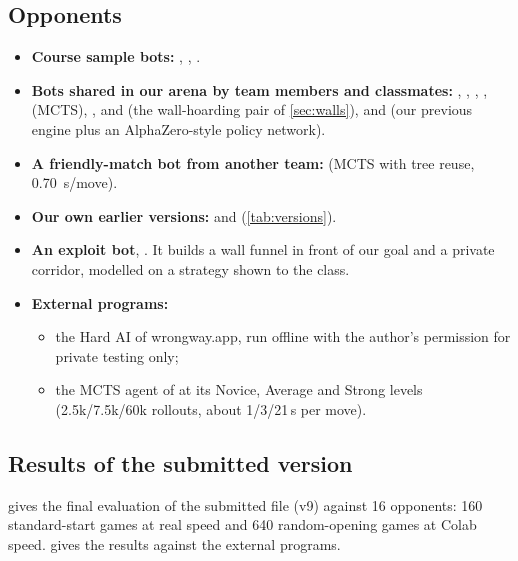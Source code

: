 \subsection{Opponents}
\label{sec:opponents}
\begin{itemize}
  \item \textbf{Course sample bots:} , , .
  \item \textbf{Bots shared in our arena by team members and classmates:}
        , , , ,
         (MCTS), ,  and 
        (the wall-hoarding pair of \cref{sec:walls}), and  (our previous
        engine plus an AlphaZero-style policy network).
  \item \textbf{A friendly-match bot from another team:}  (MCTS with tree reuse,
        \SI{0.70}{\second}/move).
  \item \textbf{Our own earlier versions:}  and 
        (\cref{tab:versions}).
  \item \textbf{An exploit bot}, . It builds a wall funnel in front of our goal and
        a private corridor, modelled on a strategy shown to the class.
  \item \textbf{External programs:}
        \begin{itemize}
          \item the Hard AI of wrongway.app, run offline with the author's permission for
                private testing only;
          \item the MCTS agent of \citet{gorisanson} at its Novice, Average and Strong levels
                (2.5k/7.5k/60k rollouts, about 1/3/21\,s per move).
        \end{itemize}
\end{itemize}

\subsection{Results of the submitted version}
 gives the final evaluation of the submitted file (v9) against 16 opponents:
160 standard-start games at real speed and 640 random-opening games at Colab speed.
 gives the results against the external programs.

